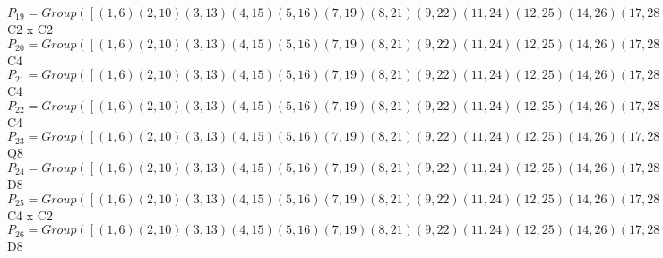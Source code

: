 \documentclass[varwidth=\maxdimen,border=10]{standalone}
\begin{document}
\begin{tabular}
$P_{19} = Group( [ ( 1, 6)( 2,10)( 3,13)( 4,15)( 5,16)( 7,19)( 8,21)( 9,22)(11,24)(12,25)(14,26)(17,28)(18,29)(20,30)(23,31)(27,32), ( 1, 2)( 3,19)( 4, 8)( 5,22)( 6,10)( 7,13)( 9,16)(11,28)(12,18)(14,30)(15,21)(17,24)(20,26)(23,27)(25,29)(31,32) ] )\cong$ C2 x C2\ \\
$P_{20} = Group( [ ( 1, 6)( 2,10)( 3,13)( 4,15)( 5,16)( 7,19)( 8,21)( 9,22)(11,24)(12,25)(14,26)(17,28)(18,29)(20,30)(23,31)(27,32), ( 1, 8, 6,21)( 2, 4,10,15)( 3,28,13,17)( 5,30,16,20)( 7,24,19,11)( 9,26,22,14)(12,27,25,32)(18,23,29,31) ] )\cong$ C4\ \\
$P_{21} = Group( [ ( 1, 6)( 2,10)( 3,13)( 4,15)( 5,16)( 7,19)( 8,21)( 9,22)(11,24)(12,25)(14,26)(17,28)(18,29)(20,30)(23,31)(27,32), ( 1,22, 6, 9)( 2,16,10, 5)( 3,18,13,29)( 4,30,15,20)( 7,12,19,25)( 8,26,21,14)(11,27,24,32)(17,23,28,31) ] )\cong$ C4\ \\
$P_{22} = Group( [ ( 1, 6)( 2,10)( 3,13)( 4,15)( 5,16)( 7,19)( 8,21)( 9,22)(11,24)(12,25)(14,26)(17,28)(18,29)(20,30)(23,31)(27,32), ( 1,32, 6,27)( 2,31,10,23)( 3,30,13,20)( 4,29,15,18)( 5,17,16,28)( 7,26,19,14)( 8,25,21,12)( 9,11,22,24) ] )\cong$ C4\ \\
$P_{23} = Group( [ ( 1, 6)( 2,10)( 3,13)( 4,15)( 5,16)( 7,19)( 8,21)( 9,22)(11,24)(12,25)(14,26)(17,28)(18,29)(20,30)(23,31)(27,32), ( 1,12, 6,25)( 2,18,10,29)( 3,16,13, 5)( 4,31,15,23)( 7,22,19, 9)( 8,32,21,27)(11,14,24,26)(17,20,28,30), ( 1,24, 6,11)( 2,28,10,17)( 3, 4,13,15)( 5,31,16,23)( 7, 8,19,21)( 9,32,22,27)(12,14,25,26)(18,20,29,30) ] )\cong$ Q8\ \\
$P_{24} = Group( [ ( 1, 6)( 2,10)( 3,13)( 4,15)( 5,16)( 7,19)( 8,21)( 9,22)(11,24)(12,25)(14,26)(17,28)(18,29)(20,30)(23,31)(27,32), ( 1, 5)( 2, 9)( 3,12)( 4,14)( 6,16)( 7,18)( 8,20)(10,22)(11,23)(13,25)(15,26)(17,27)(19,29)(21,30)(24,31)(28,32), ( 1, 2)( 3,19)( 4, 8)( 5,22)( 6,10)( 7,13)( 9,16)(11,28)(12,18)(14,30)(15,21)(17,24)(20,26)(23,27)(25,29)(31,32) ] )\cong$ D8\ \\
$P_{25} = Group( [ ( 1, 6)( 2,10)( 3,13)( 4,15)( 5,16)( 7,19)( 8,21)( 9,22)(11,24)(12,25)(14,26)(17,28)(18,29)(20,30)(23,31)(27,32), ( 1,22, 6, 9)( 2,16,10, 5)( 3,18,13,29)( 4,30,15,20)( 7,12,19,25)( 8,26,21,14)(11,27,24,32)(17,23,28,31), ( 1, 4, 6,15)( 2, 8,10,21)( 3,11,13,24)( 5,14,16,26)( 7,17,19,28)( 9,20,22,30)(12,23,25,31)(18,27,29,32) ] )\cong$ C4 x C2\ \\
$P_{26} = Group( [ ( 1, 6)( 2,10)( 3,13)( 4,15)( 5,16)( 7,19)( 8,21)( 9,22)(11,24)(12,25)(14,26)(17,28)(18,29)(20,30)(23,31)(27,32), ( 1, 5)( 2, 9)( 3,12)( 4,14)( 6,16)( 7,18)( 8,20)(10,22)(11,23)(13,25)(15,26)(17,27)(19,29)(21,30)(24,31)(28,32), ( 1, 8, 6,21)( 2, 4,10,15)( 3,28,13,17)( 5,30,16,20)( 7,24,19,11)( 9,26,22,14)(12,27,25,32)(18,23,29,31) ] )\cong$ D8\ \\

\end{tabular}
\end{document}
